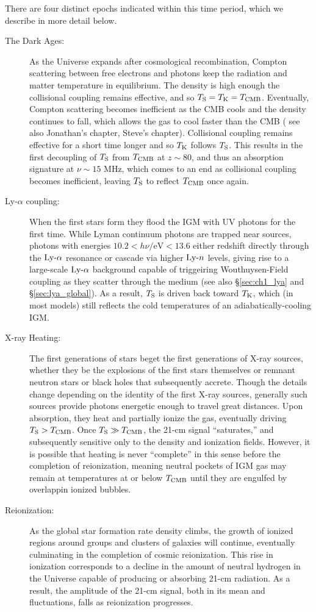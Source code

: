 There are four distinct epochs indicated within this time period, which we describe in more detail below.
\begin{description}
	\item[The Dark Ages:] As the Universe expands after cosmological recombination, Compton scattering between free electrons and photons keep the radiation and matter temperature in equilibrium. The density is high enough the collisional coupling remains effective, and so $T_{\text{S}} = T_{\text{K}} = T_{\text{CMB}}$. Eventually, Compton scattering becomes inefficient as the CMB cools and the density continues to fall, which allows the gas to cool faster than the CMB ({\color{red} see also Jonathan's chapter, Steve's chapter}). Collisional coupling remains effective for a short time longer and so $T_{\text{K}}$ follows $T_{\text{S}}$. This results in the first decoupling of $T_{\text{S}}$ from $T_{\text{CMB}}$ at $z \sim 80$, and thus an absorption signature at $\nu \sim 15$ MHz, which comes to an end as collisional coupling becomes inefficient, leaving $T_{\text{S}}$ to reflect $T_{\text{CMB}}$ once again.
	\item[Ly-$\alpha$ coupling:] When the first stars form they flood the IGM with UV photons for the first time. While Lyman continuum photons are trapped near sources, photons with energies $10.2 < h\nu / \mathrm{eV} < 13.6$ either redshift directly through the $\text{Ly-}\alpha$ resonance or cascade via higher $\text{Ly-}n$ levels, giving rise to a large-scale $\text{Ly-}\alpha$ background capable of triggeiring Wouthuysen-Field coupling as they scatter through the medium (see also \S\ref{sec:ch1_lya} and \S\ref{sec:lya_global}). As a result, $T_{\text{S}}$ is driven back toward $T_{\text{K}}$, which (in most models) still reflects the cold temperatures of an adiabatically-cooling IGM.
	\item[X-ray Heating:] The first generations of stars beget the first generations of X-ray sources, whether they be the explosions of the first stars themselves or remnant neutron stars or black holes that subsequently accrete. Though the details change depending on the identity of the first X-ray sources, generally such sources provide photons energetic enough to travel great distances. Upon absorption, they heat and partially ionize the gas, eventually driving $T_{\text{S}} > T_{\text{CMB}}$. Once $T_{\text{S}} \gg T_{\text{CMB}}$, the 21-cm signal ``saturates,'' and subsequently sensitive only to the density and ionization fields. However, it is possible that heating is never ``complete'' in this sense before the completion of reionization, meaning neutral pockets of IGM gas may remain at temperatures at or below $T_{\text{CMB}}$ until they are engulfed by overlappin ionized bubbles.
	\item[Reionization:] As the global star formation rate density climbs, the growth of ionized regions around groups and clusters of galaxies will continue, eventually culminating in the completion of cosmic reionization. This rise in ionization corresponds to a decline in the amount of neutral hydrogen in the Universe capable of producing or absorbing 21-cm radiation. As a result, the amplitude of the 21-cm signal, both in its mean and fluctuations, falls as reionization progresses.
\end{description}

